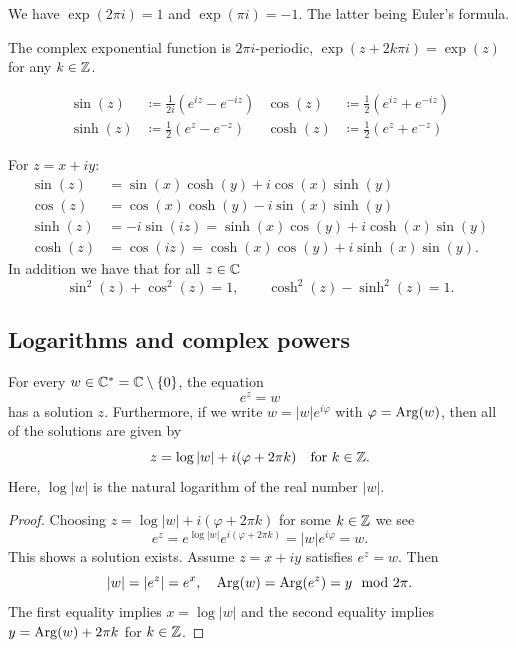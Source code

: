 \documentclass[10pt, a4paper]{article}
\begin{document}
\begin{corollary}
    We have $\exp(2\pi i) = 1$ and $\exp(\pi i) = -1$.
    The latter being Euler's formula.
\end{corollary}

\begin{corollary}
    The complex exponential function is $2\pi i$-periodic,
    $\exp(z + 2k\pi i) = \exp(z)$ for any $k \in \mathbb{Z}$.
\end{corollary}

\begin{definition}
    \begin{align*}
        \sin(z) &\coloneqq \frac{1}{2i}(e ^ {iz} - e ^ {-iz}) & \cos(z) &\coloneqq \frac{1}{2}(e ^ {iz} + e ^ {-iz}) \\
        \sinh(z) &\coloneqq \frac{1}{2}(e ^ {z} - e ^ {-z}) & \cosh(z) &\coloneqq \frac{1}{2}(e ^ {z} + e ^ {-z})
    \end{align*}
\end{definition}

\begin{lemma}
    For $z = x + iy$:
    \begin{align*}
        \sin(z) &= \sin(x)\cosh(y) + i\cos(x)\sinh(y) \\
        \cos(z) &= \cos(x)\cosh(y) - i\sin(x)\sinh(y) \\
        \sinh(z) &= -i\sin(iz) = \sinh(x)\cos(y) + i\cosh(x)\sin(y) \\
        \cosh(z) &= \cos(iz) = \cosh(x)\cos(y) + i\sinh(x)\sin(y).
    \end{align*}
    In addition we have that for all $z \in \mathbb{C}$
    \[
    \sin ^ 2(z) + \cos ^ 2(z) = 1,\qquad \cosh ^ 2(z) - \sinh ^ 2(z) = 1.
    \]
\end{lemma}

\subsection{Logarithms and complex powers}

\begin{lemma}
    For every $w \in \mathbb{C} ^ {*} = \mathbb{C} \setminus \{0\}$,
    the equation
    \[
    e ^ z = w
    \]
    has a solution $z$.
    Furthermore,
    if we write $w = |w|e ^ {i\varphi}$ with $\varphi = \operatorname{Arg}(w)$,
    then all of the solutions are given by
    \[
    z = \log{|w|} + i(\varphi + 2\pi k)\quad\text{for } k \in \mathbb{Z}.
    \]
    Here,
    $\log|w|$ is the natural logarithm of the real number $|w|$.

    \begin{proof}
        Choosing $z = \log|w| + i(\varphi + 2\pi k)$ for some $k \in \mathbb{Z}$ we see
        \[
        e ^ {z} = e ^ {\log|w|}e ^ {i(\varphi + 2\pi k)} = |w|e ^ {i\varphi} = w.
        \]
        This shows a solution exists.
        Assume $z = x + iy$ satisfies $e ^ z = w$.
        Then
        \[
        |w| = |e ^ z| = e ^ x,\quad \operatorname{Arg}(w) = \operatorname{Arg}(e ^ z) = y\mod{2\pi}.
        \]
        The first equality implies $x = \log|w|$ and the second equality implies $y = \operatorname{Arg}(w) + 2\pi k$ for $k \in \mathbb{Z}$.
    \end{proof}
\end{lemma}
\end{document}
